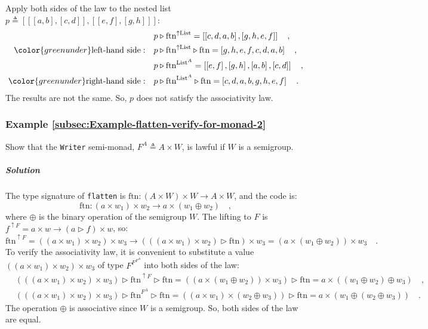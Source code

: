 Apply both sides of the law to the nested list $p\triangleq\left[\left[\left[a,b\right],\left[c,d\right]\right],\left[\left[e,f\right],\left[g,h\right]\right]\right]$:
\begin{align*}
 & p\triangleright\text{ftn}^{\uparrow\text{List}}=\left[\left[c,d,a,b\right],\left[g,h,e,f\right]\right]\quad,\\
{\color{greenunder}\text{left-hand side}:}\quad & p\triangleright\text{ftn}^{\uparrow\text{List}}\triangleright\text{ftn}=\left[g,h,e,f,c,d,a,b\right]\quad,\\
 & p\triangleright\text{ftn}^{\text{List}^{A}}=\left[\left[e,f\right],\left[g,h\right],\left[a,b\right],\left[c,d\right]\right]\quad,\\
{\color{greenunder}\text{right-hand side}:}\quad & p\triangleright\text{ftn}^{\text{List}^{A}}\triangleright\text{ftn}=\left[c,d,a,b,g,h,e,f\right]\quad.
\end{align*}
The results are not the same. So, $p$ does not satisfy the associativity
law.

\subsubsection{Example \label{subsec:Example-flatten-verify-for-monad-2}\ref{subsec:Example-flatten-verify-for-monad-2}}

Show that the \lstinline!Writer! semi-monad, $F^{A}\triangleq A\times W$,
is lawful if $W$ is a semigroup.

\subparagraph{Solution}

The type signature of \lstinline!flatten! is $\text{ftn}:\left(A\times W\right)\times W\rightarrow A\times W$,
and the code is:
\[
\text{ftn}:\left(a\times w_{1}\right)\times w_{2}\rightarrow a\times\left(w_{1}\oplus w_{2}\right)\quad,
\]
where $\oplus$ is the binary operation of the semigroup $W$. The
lifting to $F$ is $f^{\uparrow F}=a\times w\rightarrow\left(a\triangleright f\right)\times w$,
so:
\[
\text{ftn}^{\uparrow F}=\left(\left(a\times w_{1}\right)\times w_{2}\right)\times w_{3}\rightarrow\left(\left(\left(a\times w_{1}\right)\times w_{2}\right)\triangleright\text{ftn}\right)\times w_{3}=\left(a\times\left(w_{1}\oplus w_{2}\right)\right)\times w_{3}\quad.
\]
To verify the associativity law, it is convenient to substitute a
value $\left(\left(a\times w_{1}\right)\times w_{2}\right)\times w_{3}$
of type $F^{F^{F^{A}}}$ into both sides of the law:
\begin{align*}
 & \left(\left(\left(a\times w_{1}\right)\times w_{2}\right)\times w_{3}\right)\triangleright\text{ftn}^{\uparrow F}\triangleright\text{ftn}=\left(\left(a\times\left(w_{1}\oplus w_{2}\right)\right)\times w_{3}\right)\triangleright\text{ftn}=a\times\left(\left(w_{1}\oplus w_{2}\right)\oplus w_{3}\right)\quad,\\
 & \left(\left(\left(a\times w_{1}\right)\times w_{2}\right)\times w_{3}\right)\triangleright\text{ftn}^{F^{A}}\triangleright\text{ftn}=\left(\left(a\times w_{1}\right)\times\left(w_{2}\oplus w_{3}\right)\right)\triangleright\text{ftn}=a\times\left(w_{1}\oplus\left(w_{2}\oplus w_{3}\right)\right)\quad.
\end{align*}
The operation $\oplus$ is associative since $W$ is a semigroup.
So, both sides of the law are equal.

